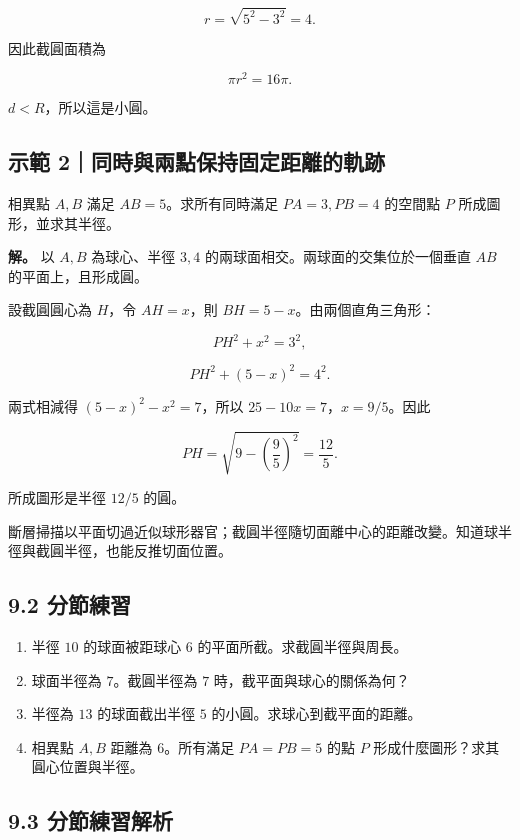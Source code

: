 \documentclass[11pt,a4paper]{article}
\providecommand{\tightlist}{%
  \setlength{\itemsep}{0pt}\setlength{\parskip}{0pt}}
\begin{document}
\[
r=\sqrt{5^2-3^2}=4.
\]

因此截圓面積為

\[
\pi r^2=16\pi.
\]

\(d<R\)，所以這是小圓。

\subsection{示範 2｜同時與兩點保持固定距離的軌跡}\label{ux793aux7bc4-2ux540cux6642ux8207ux5169ux9edeux4fddux6301ux56faux5b9aux8dddux96e2ux7684ux8eccux8de1}

相異點 \(A,B\) 滿足 \(AB=5\)。求所有同時滿足 \(PA=3,PB=4\) 的空間點 \(P\) 所成圖形，並求其半徑。

\textbf{解。} 以 \(A,B\) 為球心、半徑 \(3,4\) 的兩球面相交。兩球面的交集位於一個垂直 \(AB\) 的平面上，且形成圓。

設截圓圓心為 \(H\)，令 \(AH=x\)，則 \(BH=5-x\)。由兩個直角三角形：

\[
PH^2+x^2=3^2,
\]

\[
PH^2+(5-x)^2=4^2.
\]

兩式相減得 \((5-x)^2-x^2=7\)，所以 \(25-10x=7\)，\(x=9/5\)。因此

\[
PH=\sqrt{9-\left(\frac95\right)^2}=\frac{12}{5}.
\]

所成圖形是半徑 \(12/5\) 的圓。

斷層掃描以平面切過近似球形器官；截圓半徑隨切面離中心的距離改變。知道球半徑與截圓半徑，也能反推切面位置。

\subsection{9.2 分節練習}\label{ux5206ux7bc0ux7df4ux7fd2-8}

\begin{enumerate}
\def\labelenumi{\arabic{enumi}.}
\tightlist
\item
  半徑 \(10\) 的球面被距球心 \(6\) 的平面所截。求截圓半徑與周長。
\item
  球面半徑為 \(7\)。截圓半徑為 \(7\) 時，截平面與球心的關係為何？
\item
  半徑為 \(13\) 的球面截出半徑 \(5\) 的小圓。求球心到截平面的距離。
\item
  相異點 \(A,B\) 距離為 \(6\)。所有滿足 \(PA=PB=5\) 的點 \(P\) 形成什麼圖形？求其圓心位置與半徑。
\end{enumerate}

\subsection{9.3 分節練習解析}\label{ux5206ux7bc0ux7df4ux7fd2ux89e3ux6790-8}
\end{document}
